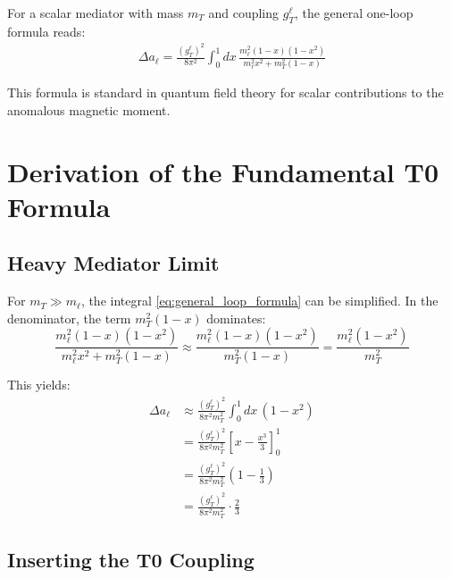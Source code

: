 	For a scalar mediator with mass $m_T$ and coupling $g_T^\ell$, the general one-loop formula reads:
	\begin{equation}
		\begin{split}
			\Delta a_\ell = \frac{(g_T^\ell)^2}{8\pi^2} \int_0^1 dx \, 
			\frac{m_\ell^2 (1-x)(1-x^2)}{m_\ell^2 x^2 + m_T^2 (1-x)}
		\end{split}
		\label{eq:general_loop_formula}
	\end{equation}
	
	This formula is standard in quantum field theory for scalar contributions to the anomalous magnetic moment.
	
	\section{Derivation of the Fundamental T0 Formula}
	
	\subsection{Heavy Mediator Limit}
	
	For $m_T \gg m_\ell$, the integral \eqref{eq:general_loop_formula} can be simplified. In the denominator, the term $m_T^2 (1-x)$ dominates:
	\begin{equation}
		\frac{m_\ell^2 (1-x)(1-x^2)}{m_\ell^2 x^2 + m_T^2 (1-x)} 
		\approx \frac{m_\ell^2 (1-x)(1-x^2)}{m_T^2 (1-x)} 
		= \frac{m_\ell^2 (1-x^2)}{m_T^2}
		\label{eq:heavy_mediator_approx}
	\end{equation}
	
	This yields:
	\begin{equation}
		\begin{split}
			\Delta a_\ell &\approx \frac{(g_T^\ell)^2}{8\pi^2 m_T^2} \int_0^1 dx \, (1-x^2) \\
			&= \frac{(g_T^\ell)^2}{8\pi^2 m_T^2} \left[x - \frac{x^3}{3}\right]_0^1 \\
			&= \frac{(g_T^\ell)^2}{8\pi^2 m_T^2} \left(1 - \frac{1}{3}\right) \\
			&= \frac{(g_T^\ell)^2}{8\pi^2 m_T^2} \cdot \frac{2}{3}
		\end{split}
		\label{eq:integral_evaluation}
	\end{equation}
	
	\subsection{Inserting the T0 Coupling}
	

